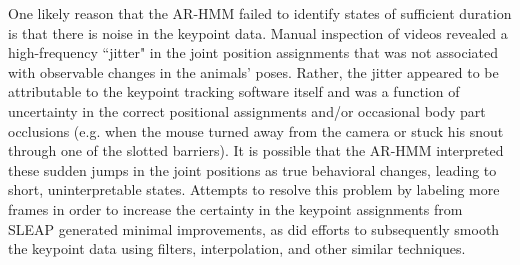 One likely reason that the AR-HMM failed to identify states of sufficient duration is that there is noise in the keypoint data. Manual inspection of videos revealed a high-frequency ``jitter" in the joint position assignments that was not associated with observable changes in the animals' poses. Rather, the jitter appeared to be attributable to the keypoint tracking software itself and was a function of uncertainty in the correct positional assignments and/or occasional body part occlusions (e.g. when the mouse turned away from the camera or stuck his snout through one of the slotted barriers). It is possible that the AR-HMM interpreted these sudden jumps in the joint positions as true behavioral changes, leading to short, uninterpretable states. Attempts to resolve this problem by labeling more frames in order to increase the certainty in the keypoint assignments from SLEAP generated minimal improvements, as did efforts to subsequently smooth the keypoint data using filters, interpolation, and other similar techniques. 